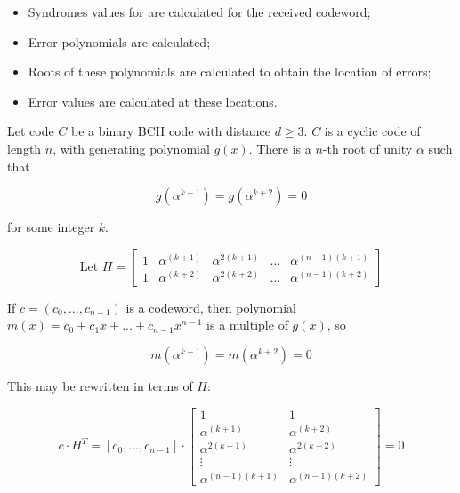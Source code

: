 \documentclass[../main.tex]{subfiles}
\begin{document}
    \begin{itemize}
        \item Syndromes values for are calculated for the received codeword;
        \item Error polynomials are calculated;
        \item Roots of these polynomials are calculated to obtain the location of errors;
        \item Error values are calculated at these locations.
    \end{itemize}

    Let code $C$ be a binary BCH code with distance $d \geq 3$. $C$ is a cyclic code of length $n$, with generating polynomial $g(x)$. There is a $n$-th root of unity $\alpha$ such that

    \begin{equation*}
        g(\alpha^{k+1}) = g(\alpha^{k+2}) = 0
    \end{equation*}

    \noindent
    for some integer $k$.

    \begin{equation*}
        \text{Let } H =
        \begin{bmatrix}
            1 & \alpha^{(k+1)} & \alpha^{2(k+1)} & \dots & \alpha^{(n-1)(k+1)}\\
            1 & \alpha^{(k+2)} & \alpha^{2(k+2)} & \dots & \alpha^{(n-1)(k+2)}
        \end{bmatrix}
    \end{equation*}

    \noindent
    If $c = (c_0, \dots, c_{n-1})$ is a codeword, then polynomial $m(x) = c_0 + c_1x + ... + c_{n-1}x^{n -1}$ is a multiple of $g(x)$, so

    \begin{equation*}
        m(\alpha^{k+1}) = m(\alpha^{k+2}) = 0
    \end{equation*}

    \noindent
    This may be rewritten in terms of $H$:

    \begin{equation*}
        c \cdot H^T = [c_0, \dots, c_{n-1}] \cdot
        \begin{bmatrix}
            1 & 1\\
            \alpha^{(k+1)} & \alpha^{(k+2)}\\
            \alpha^{2(k+1)} & \alpha^{2(k+2)}\\
            \vdots & \vdots\\
            \alpha^{(n-1)(k+1)} & \alpha^{(n-1)(k+2)}
        \end{bmatrix}
        = 0
    \end{equation*}
\end{document}
